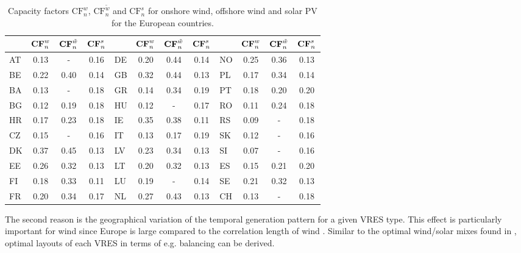 \documentclass[a4paper, 5p, sort&compress]{elsarticle}%
\begin{document}
\begin{table}[t!]
  \caption{Capacity factors $\text{CF}_n^w$, $\text{CF}_n^{\tilde{w}}$ and  $\text{CF}_n^s$ for onshore wind, offshore wind and solar PV for the European countries.}
  \label{tab:capacity-factors}
  \begin{adjustbox}{center}
    \begin{tabular}{lccclccclccc}  \toprule
      & $\text{\textbf{CF}}_n^w$ & $\text{\textbf{CF}}_n^{\tilde{w}}$ & $\text{\textbf{CF}}_n^s$ &  & $\text{\textbf{CF}}_n^w$ &
      $\text{\textbf{CF}}_n^{\tilde{w}}$ & $\text{\textbf{CF}}_n^s$ &  & $\text{\textbf{CF}}_n^w$ & $\text{\textbf{CF}}_n^{\tilde{w}}$ &
      $\text{\textbf{CF}}_n^s$\\ \midrule
      AT & 0.13 & - & 0.16 & DE & 0.20 & 0.44 & 0.14 & NO & 0.25 & 0.36 & 0.13\\
      BE & 0.22 & 0.40 & 0.14 & GB & 0.32 & 0.44 & 0.13 & PL & 0.17 & 0.34 & 0.14\\
      BA & 0.13 & - & 0.18 & GR & 0.14 & 0.34 & 0.19 & PT & 0.18 & 0.20 & 0.20\\
      BG & 0.12 & 0.19 & 0.18 & HU & 0.12 & - & 0.17 & RO & 0.11 & 0.24 & 0.18\\
      HR & 0.17 & 0.23 & 0.18 & IE & 0.35 & 0.38 & 0.11 & RS & 0.09 & - & 0.18\\
      CZ & 0.15 & - & 0.16 & IT & 0.13 & 0.17 & 0.19 & SK & 0.12 & - & 0.16\\
      DK & 0.37 & 0.45 & 0.13 & LV & 0.23 & 0.34 & 0.13 & SI & 0.07 & - & 0.16\\
      EE & 0.26 & 0.32 & 0.13 & LT & 0.20 & 0.32 & 0.13 & ES & 0.15 & 0.21 & 0.20\\
      FI & 0.18 & 0.33 & 0.11 & LU & 0.19 & - & 0.14 & SE & 0.21 & 0.32 & 0.13\\
      FR & 0.20 & 0.34 & 0.17 & NL & 0.27 & 0.43 & 0.13 & CH & 0.13 & - & 0.18\\ \bottomrule
    \end{tabular}
  \end{adjustbox}
\end{table}


The second reason is the geographical variation of the temporal
generation pattern for a given VRES type. This effect is particularly
important for wind since Europe is large compared to the correlation
length of wind %
\cite{Widen2011}. Similar to the optimal wind/solar mixes found in
\cite{Heide2010,Heide2011}, optimal layouts of each VRES in terms of
e.g. balancing can be derived.
\end{document}
